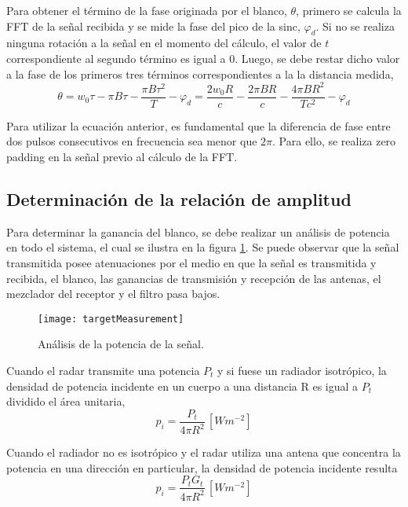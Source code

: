 Para obtener el término de la fase originada por el blanco, $\theta$, primero se calcula la FFT de la señal recibida y se mide la fase del pico de la sinc, $\varphi_d$. Si no se realiza ninguna rotación a la señal en el momento del cálculo, el valor de $t$ correspondiente al segundo término es igual a 0. Luego, se debe restar dicho valor a la fase de los primeros tres términos correspondientes a la la distancia medida, 
\begin{equation}\label{eq:phaseMeasurement}
  \theta =  w_0\tau - \pi B\tau - \dfrac{\pi B\tau^2}{T} - \varphi_d  = \dfrac{2w_0R}{c} - \dfrac{2\pi BR}{c} - \dfrac{4\pi BR^2}{Tc^2} - \varphi_d
\end{equation}

Para utilizar la ecuación anterior, es fundamental que la diferencia de fase entre dos pulsos consecutivos en frecuencia sea menor que $2\pi$. Para ello, se realiza zero padding en la señal previo al cálculo de la FFT.


\subsection{Determinación de la relación de amplitud}

Para determinar la ganancia del blanco, se debe realizar un análisis de potencia en todo el sistema, el cual se ilustra en la figura  \ref{fig:powerAnalysis}. Se puede observar que la señal transmitida posee atenuaciones por el medio en que la señal es transmitida y recibida, el blanco, las ganancias de transmisión y recepción de las antenas, el mezclador del receptor y el filtro pasa bajos. 

\begin{figure}
 \centering
 \texttt{[image: targetMeasurement]}
 \caption{Análisis de la potencia de la señal.}
 \label{fig:powerAnalysis}
\end{figure}

Cuando el radar transmite una potencia $P_t$ y si fuese un radiador isotrópico, la densidad de potencia incidente en un cuerpo a una distancia R es igual a $P_t$ dividido el área unitaria,
\begin{equation}
  p_i = \dfrac{P_t}{4\pi R^2} \,[\si{Wm^{-2}}]
\end{equation}

Cuando el radiador no es isotrópico y el radar utiliza una antena que concentra la potencia en una dirección en particular, la densidad de potencia incidente resulta
\begin{equation}
  p_i = \dfrac{P_tG_t}{4\pi R^2} \,[\si{Wm^{-2}}]
\end{equation}

